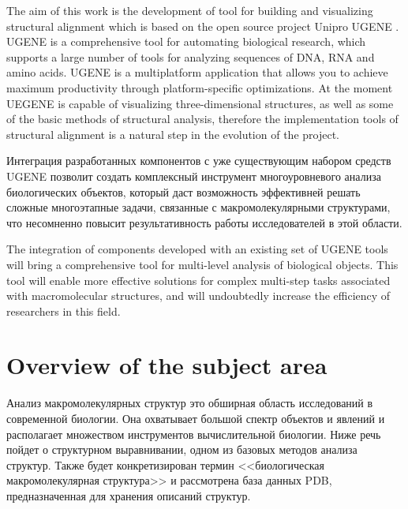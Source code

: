 \documentclass[a4paper, 12pt, titlepage, utf8]{extarticle}
\let\oldsection\section         %
\renewcommand{\section}{\newpage\oldsection}
\begin{document}
The aim of this work is the development of tool for building and visualizing
structural alignment which is based on the open source project Unipro UGENE
\cite {ugene}. UGENE is a comprehensive tool for automating biological research,
which supports a large number of tools for analyzing sequences of DNA, RNA and
amino acids. UGENE is a multiplatform application that allows you to achieve
maximum productivity through platform-specific optimizations. At the moment
UEGENE is capable of visualizing three-dimensional structures, as well as some
of the basic methods of structural analysis, therefore the implementation tools
of structural alignment is a natural step in the evolution of the project.

\begin{original}
Интеграция разработанных компонентов с уже существующим набором средств UGENE
позволит создать комплексный инструмент многоуровневого анализа биологических
объектов, который даст возможность эффективней решать сложные многоэтапные
задачи, связанные с макромолекулярными структурами, что несомненно повысит
результативность работы исследователей в этой области.
\end{original}

The integration of components developed with an existing set of UGENE tools will
bring a comprehensive tool for multi-level analysis of biological objects. This
tool will enable more effective solutions for complex multi-step tasks
associated with macromolecular structures, and will undoubtedly increase the
efficiency of researchers in this field.



\section{Overview of the subject area}	%
\begin{original}
Анализ макромолекулярных структур это обширная область исследований в
современной биологии. Она охватывает большой спектр объектов и явлений и
располагает множеством инструментов вычислительной биологии. Ниже речь пойдет о
структурном выравнивании, одном из базовых методов анализа структур. Также будет
конкретизирован термин <<биологическая макромолекулярная структура>> и
рассмотрена база данных PDB, предназначенная для хранения описаний структур.
\end{original}
\end{document}
